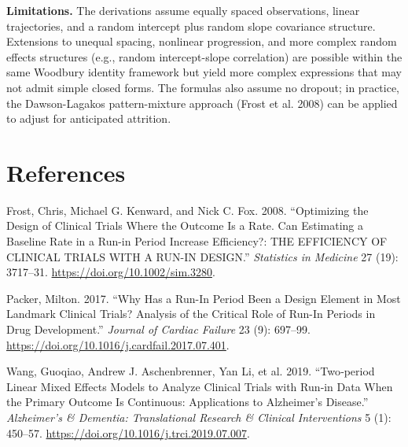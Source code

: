 \documentclass[
]{article}
\newlength{\cslhangindent}
\newenvironment{CSLReferences}[2] %
 {\begin{list}{}{%
  \setlength{\itemindent}{0pt}
  \setlength{\leftmargin}{0pt}
  \setlength{\parsep}{0pt}
  \ifodd #1
   \setlength{\leftmargin}{\cslhangindent}
   \setlength{\itemindent}{-1\cslhangindent}
  \fi
  \setlength{\itemsep}{#2\baselineskip}}}
 {\end{list}}
\begin{document}
\textbf{Limitations.} The derivations assume equally spaced
observations, linear trajectories, and a random intercept plus random
slope covariance structure. Extensions to unequal spacing, nonlinear
progression, and more complex random effects structures (e.g., random
intercept-slope correlation) are possible within the same Woodbury
identity framework but yield more complex expressions that may not admit
simple closed forms. The formulas also assume no dropout; in practice,
the Dawson-Lagakos pattern-mixture approach (Frost et al. 2008) can be
applied to adjust for anticipated attrition.

\section*{References}\label{references}

\protect{}\label{refs}
\begin{CSLReferences}{1}{1}
Frost, Chris, Michael G. Kenward, and Nick C. Fox. 2008. {``Optimizing
the Design of Clinical Trials Where the Outcome Is a Rate. {Can}
Estimating a Baseline Rate in a Run-in Period Increase Efficiency?:
{THE} {EFFICIENCY} {OF} {CLINICAL} {TRIALS} {WITH} {A} {RUN}-{IN}
{DESIGN}.''} \emph{Statistics in Medicine} 27 (19): 3717--31.
\url{https://doi.org/10.1002/sim.3280}.

Packer, Milton. 2017. {``Why {Has} a {Run}-{In} {Period} {Been} a
{Design} {Element} in {Most} {Landmark} {Clinical} {Trials}? {Analysis}
of the {Critical} {Role} of {Run}-{In} {Periods} in {Drug}
{Development}.''} \emph{Journal of Cardiac Failure} 23 (9): 697--99.
\url{https://doi.org/10.1016/j.cardfail.2017.07.401}.

Wang, Guoqiao, Andrew J. Aschenbrenner, Yan Li, et al. 2019.
{``Two‐period Linear Mixed Effects Models to Analyze Clinical Trials
with Run‐in Data When the Primary Outcome Is Continuous: {Applications}
to {Alzheimer}'s Disease.''} \emph{Alzheimer's \& Dementia:
Translational Research \& Clinical Interventions} 5 (1): 450--57.
\url{https://doi.org/10.1016/j.trci.2019.07.007}.

\end{CSLReferences}
\end{document}
